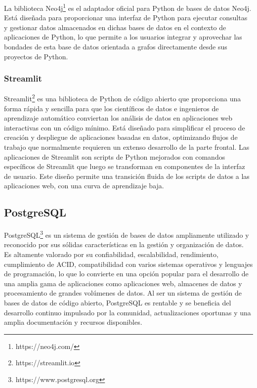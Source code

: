 La biblioteca Neo4j\footnote{https://neo4j.com/} es el adaptador oficial para Python de bases de datos Neo4j. Está 
diseñada para proporcionar una 
interfaz de Python para ejecutar 
consultas y gestionar datos almacenados en dichas bases de datos en el contexto de aplicaciones de Python, lo que permite 
a los usuarios integrar y aprovechar las bondades de esta base de datos orientada a grafos directamente desde sus 
proyectos de Python.

\subsubsection{Streamlit}

Streamlit\footnote{https://streamlit.io} es una biblioteca de Python de código abierto que proporciona una forma rápida y sencilla para que los 
científicos de datos e ingenieros de aprendizaje automático conviertan los análisis de datos en aplicaciones web 
interactivas con un código mínimo. Está diseñado para simplificar el proceso de creación y despliegue de aplicaciones 
basadas en datos, optimizando flujos de trabajo que normalmente requieren un extenso desarrollo de la parte frontal. 
Las aplicaciones de Streamlit son scripts de Python mejorados con comandos específicos de Streamlit que luego se 
transforman en componentes de la interfaz de usuario. Este diseño 
permite una transición fluida de los scripts de datos a las aplicaciones web, con una curva de aprendizaje baja.


\subsection{PostgreSQL}

PostgreSQL\footnote{https://www.postgresql.org} es un sistema de gestión de bases de datos ampliamente utilizado y 
reconocido por sus sólidas 
características en la gestión y organización de datos. Es altamente valorado por su confiabilidad, escalabilidad, 
rendimiento, cumplimiento de ACID, compatibilidad con varios sistemas operativos y lenguajes de programación, lo que 
lo convierte en una opción popular para el desarrollo de una amplia gama de aplicaciones 
como aplicaciones web, 
almacenes de datos y procesamiento de grandes volúmenes de datos. 
Al ser un sistema de gestión de bases de datos de código abierto, PostgreSQL es rentable y se beneficia del 
desarrollo continuo impulsado por la comunidad, actualizaciones oportunas y una amplia documentación y recursos 
disponibles.

